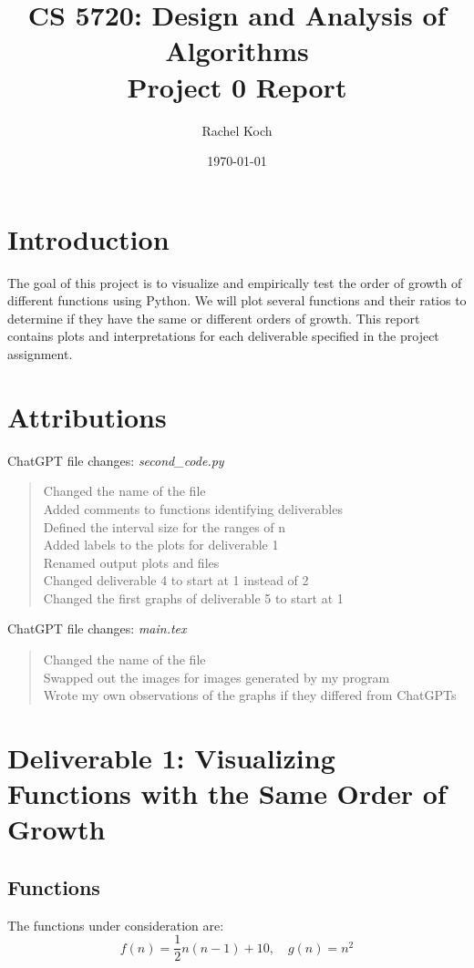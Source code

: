 \documentclass{article}
\title{CS 5720: Design and Analysis of Algorithms \\ Project 0 Report}
\author{Rachel Koch}
\date{\today}
\begin{document}
\maketitle

\section{Introduction}

The goal of this project is to visualize and empirically test the order of growth of different functions using Python. We will plot several functions and their ratios to determine if they have the same or different orders of growth. This report contains plots and interpretations for each deliverable specified in the project assignment.

\section{Attributions}

ChatGPT file changes: \textit{second\_code.py}

\begin{quote}
Changed the name of the file\\
Added comments to functions identifying deliverables\\
Defined the interval size for the ranges of n\\
Added labels to the plots for deliverable 1\\
Renamed output plots and files\\
Changed deliverable 4 to start at 1 instead of 2\\
Changed the first graphs of deliverable 5 to start at 1
\end{quote}
ChatGPT file changes: \textit{main.tex}

\begin{quote}
Changed the name of the file\\
Swapped out the images for images generated by my program\\
Wrote my own observations of the graphs if they differed from ChatGPTs
\end{quote}

\section{Deliverable 1: Visualizing Functions with the Same Order of Growth}

\subsection{Functions}
The functions under consideration are:
\[
f(n) = \frac{1}{2}n(n - 1) + 10, \quad g(n) = n^2
\]
\end{document}
